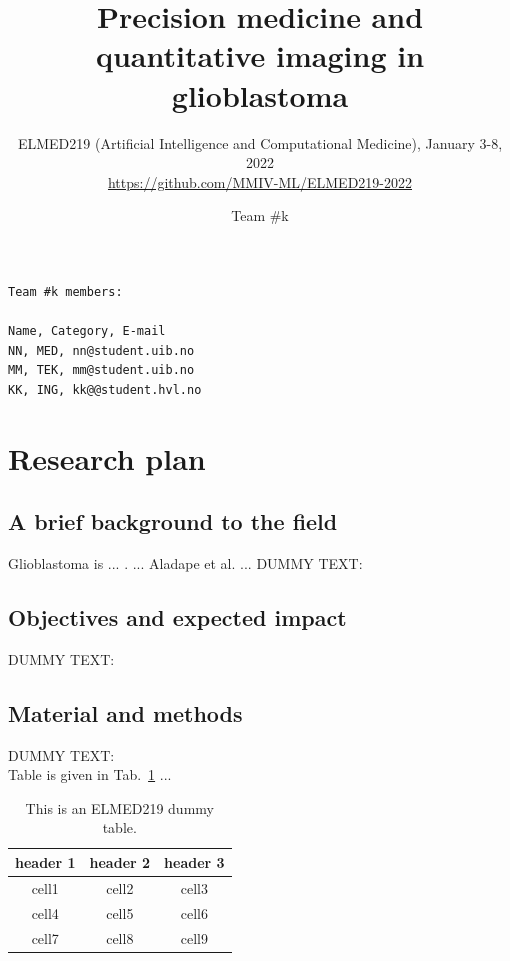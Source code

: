 \documentclass[11pt]{article}
\title{Precision medicine and quantitative imaging in glioblastoma}
\author{ELMED219 (Artificial Intelligence and Computational Medicine), January 3-8, 2022\\
{\footnotesize \url{https://github.com/MMIV-ML/ELMED219-2022}}}
\date{Team \#k}
\begin{document}
\maketitle

\begin{scriptsize}
\begin{verbatim}
Team #k members:

Name, Category, E-mail	
NN, MED, nn@student.uib.no
MM, TEK, mm@student.uib.no
KK, ING, kk@@student.hvl.no

\end{verbatim}
\end{scriptsize}

\vspace{3mm}
\section{Research plan} %

\vspace{3mm}

\subsection{A brief background to the field}

Glioblastoma is ...  \cite{Louis2019}. ...  Aladape et al. \cite{Aldape2019} ... 
DUMMY TEXT:
\lipsum[5]

\subsection{Objectives and expected impact}

DUMMY TEXT:
\lipsum[5]


\subsection{Material and methods}

DUMMY TEXT:
\lipsum[6] \\

Table is given in Tab.~\ref{tab:elmed219-dummy} ...

\begin{table}[H]
\begin{center}
\begin{tabular}{ |c|c|c| } 
 \hline
 header 1 & header 2 & header 3 \\ 
 \hline
 cell1 & cell2 & cell3 \\ 
 cell4 & cell5 & cell6 \\ 
 cell7 & cell8 & cell9 \\ 
 \hline
\end{tabular}
\end{center}
\caption{This is an ELMED219 dummy table.}
\label{tab:elmed219-dummy}
\end{table}
\end{document}
